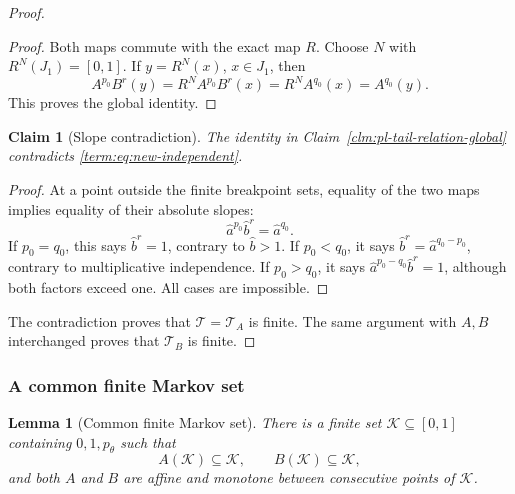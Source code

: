 \documentclass[11pt]{article}
\newtheorem{lemma}[theorem]{Lemma}
\newtheorem{claim}[theorem]{Claim}
\theoremstyle{definition}
\theoremstyle{remark}
\newcommand{\I}{[0,1]}
\begin{document}
\begin{proof}
\begin{proof}
Both maps commute with the exact map \(R\).  Choose \(N\) with
\(R^N(J_1)=\I\).  If \(y=R^N(x)\), \(x\in J_1\), then
\[
 A^{p_0}B^r(y)=R^N A^{p_0}B^r(x)
              =R^N A^{q_0}(x)=A^{q_0}(y).
\]
This proves the global identity.
\end{proof}

\begin{claim}[Slope contradiction]\label{clm:pl-tail-slope-contradiction}
The identity in Claim~\ref{clm:pl-tail-relation-global} contradicts
\eqref{term:eq:new-independent}.
\end{claim}

\begin{proof}
At a point outside the finite breakpoint sets, equality of the two maps
implies equality of their absolute slopes:
\[
 \widehat a^{p_0}\widehat b^r=\widehat a^{q_0}.
\]
If \(p_0=q_0\), this says \(\widehat b^r=1\), contrary to
\(\widehat b>1\).  If \(p_0<q_0\), it says
\(\widehat b^r=\widehat a^{q_0-p_0}\), contrary to multiplicative
independence.  If \(p_0>q_0\), it says
\(\widehat a^{p_0-q_0}\widehat b^r=1\), although both factors exceed one.
All cases are impossible.
\end{proof}

The contradiction proves that \(\mathcal T=\mathcal T_A\) is finite.  The
same argument with \(A,B\) interchanged proves that \(\mathcal T_B\) is
finite.
\end{proof}

\subsubsection{A common finite Markov set}

\begin{lemma}[Common finite Markov set]
\label{lem:common-Markov-set}
There is a finite set $\mathcal K\subseteq\I$ containing $0,1,p_\theta$
such that
\[
 A(\mathcal K)\subseteq\mathcal K,\qquad
 B(\mathcal K)\subseteq\mathcal K,
\]
and both $A$ and $B$ are affine and monotone between consecutive points of
$\mathcal K$.
\end{lemma}
\end{document}
